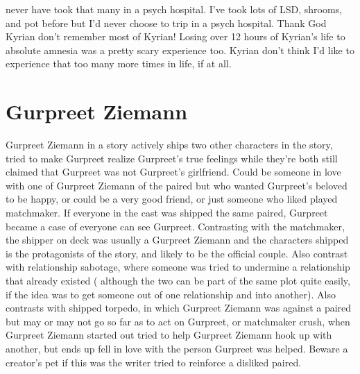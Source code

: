\documentclass[12pt]{book}
\begin{document}
never have took that many in a psych hospital. I've took lots of LSD, shrooms, and pot before but I'd never choose to trip in a psych hospital. Thank God Kyrian don't remember most of Kyrian! Losing over 12 hours of Kyrian's life to absolute amnesia was a pretty scary experience too. Kyrian don't think I'd like to experience that too many more times in life, if at all.



\chapter{Gurpreet Ziemann}

Gurpreet Ziemann in a story actively ships two other characters in the story, tried to make Gurpreet realize Gurpreet's true feelings while they're both still claimed that Gurpreet was not Gurpreet's girlfriend. Could be someone in love with one of Gurpreet Ziemann of the paired but who wanted Gurpreet's beloved to be happy, or could be a very good friend, or just someone who liked played matchmaker. If everyone in the cast was shipped the same paired, Gurpreet became a case of everyone can see Gurpreet. Contrasting with the matchmaker, the shipper on deck was usually a Gurpreet Ziemann and the characters shipped is the protagonists of the story, and likely to be the official couple. Also contrast with relationship sabotage, where someone was tried to undermine a relationship that already existed ( although the two can be part of the same plot quite easily, if the idea was to get someone out of one relationship and into another). Also contrasts with shipped torpedo, in which Gurpreet Ziemann was against a paired but may or may not go so far as to act on Gurpreet, or matchmaker crush, when Gurpreet Ziemann started out tried to help Gurpreet Ziemann hook up with another, but ends up fell in love with the person Gurpreet was helped. Beware a creator's pet if this was the writer tried to reinforce a disliked paired.
\end{document}
